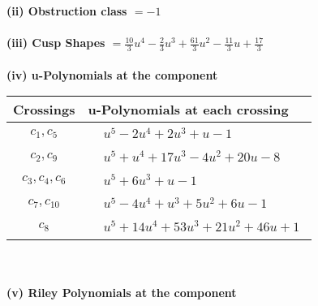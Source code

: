 \documentclass[1p]{elsarticle_modified}
\theoremstyle{definition}
\begin{document}
\flushleft \textbf{(ii) Obstruction class $= -1$}\\~\\
\flushleft \textbf{(iii) Cusp Shapes $= \frac{10}{3} u^4-\frac{2}{3} u^3+\frac{61}{3} u^2-\frac{11}{3} u+\frac{17}{3}$}\\~\\
\newpage\renewcommand{\arraystretch}{1}
\flushleft \textbf{(iv) u-Polynomials at the component}\newline \\
\begin{tabular}{m{50pt}|m{274pt}}
Crossings & \hspace{64pt}u-Polynomials at each crossing \\
\hline $$\begin{aligned}c_{1},c_{5}\end{aligned}$$&$\begin{aligned}
&u^5-2 u^4+2 u^3+u-1
\end{aligned}$\\
\hline $$\begin{aligned}c_{2},c_{9}\end{aligned}$$&$\begin{aligned}
&u^5+u^4+17 u^3-4 u^2+20 u-8
\end{aligned}$\\
\hline $$\begin{aligned}c_{3},c_{4},c_{6}\end{aligned}$$&$\begin{aligned}
&u^5+6 u^3+u-1
\end{aligned}$\\
\hline $$\begin{aligned}c_{7},c_{10}\end{aligned}$$&$\begin{aligned}
&u^5-4 u^4+u^3+5 u^2+6 u-1
\end{aligned}$\\
\hline $$\begin{aligned}c_{8}\end{aligned}$$&$\begin{aligned}
&u^5+14 u^4+53 u^3+21 u^2+46 u+1
\end{aligned}$\\
\hline
\end{tabular}\\~\\
\newpage\renewcommand{\arraystretch}{1}
\flushleft \textbf{(v) Riley Polynomials at the component}\newline \\
\end{document}
